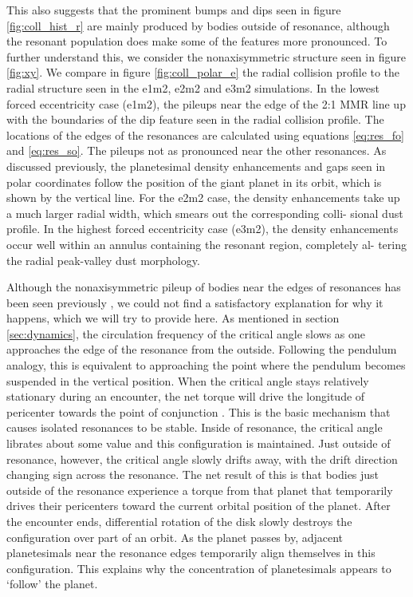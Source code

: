 \documentclass[twocolumn]{aastex63}
\begin{document}
This also suggests that the prominent bumps and dips seen in figure \ref{fig:coll_hist_r} are mainly produced by bodies outside of resonance, although 
the resonant population does make some of the features more pronounced. To further understand this, we consider the nonaxisymmetric structure 
seen in figure \ref{fig:xy}. We compare in figure \ref{fig:coll_polar_e} the radial collision profile to the radial structure seen in the e1m2, e2m2 and 
e3m2 simulations. In the lowest forced eccentricity case (e1m2), the pileups near the edge of the 2:1 MMR line up with the boundaries of the dip 
feature seen in the radial collision profile. The locations of the edges of the resonances are calculated using equations \ref{eq:res_fo} and 
\ref{eq:res_so}. The pileups not as pronounced near the other resonances. As discussed previously, the planetesimal density enhancements and gaps 
seen in polar coordinates follow the position of the giant planet in its orbit, which is shown by the vertical line. For the e2m2 case, the density 
enhancements take up a much larger radial width, which smears out the corresponding colli- sional dust profile. In the highest forced eccentricity case 
(e3m2), the density enhancements occur well within an annulus containing the resonant region, completely al- tering the radial peak-valley dust 
morphology.

Although the nonaxisymmetric pileup of bodies near the edges of resonances has been seen previously 
\citep{2000Icar..143...45R, 2016ApJ...818..159T}, we could not find a satisfactory explanation for why it happens, which we will try to provide here. As 
mentioned in section \ref{sec:dynamics}, the circulation frequency of the critical angle slows as one approaches the edge of the resonance from the 
outside. Following the pendulum analogy, this is equivalent to approaching the point where the pendulum becomes suspended in the vertical position. 
When the critical angle stays relatively stationary during an encounter, the net torque will drive the longitude of pericenter towards the point of 
conjunction \citep{1976ARA&A..14..215P}.  This is the basic mechanism that causes isolated resonances to be stable. Inside of resonance, the critical 
angle librates about some value and this configuration is maintained. Just outside of resonance, however, the critical angle slowly drifts away, with the 
drift direction changing sign across the resonance. The net result of this is that bodies just outside of the resonance experience a torque from that 
planet that temporarily drives their pericenters toward the current orbital position of the planet. After the encounter ends, differential rotation of the disk 
slowly destroys the configuration over part of an orbit. As the planet passes by, adjacent planetesimals near the resonance edges temporarily align 
themselves in this configuration. This explains why the concentration of planetesimals appears to `follow' the planet.
\end{document}
